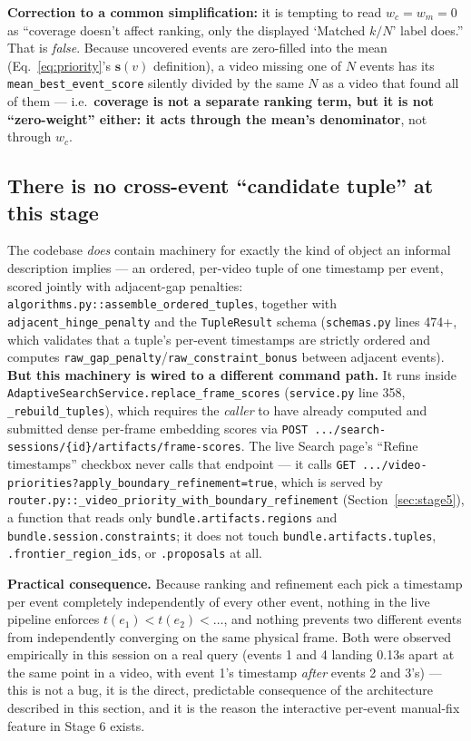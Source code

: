 \documentclass[11pt]{article}
\newcommand{\code}[1]{\texttt{\small #1}}
\newcommand{\file}[1]{\texttt{\footnotesize #1}}
\newcommand{\corr}[1]{\textbf{\textcolor{red!60!black}{#1}}}
\begin{document}
\corr{Correction to a common simplification:} it is tempting to read
$w_c = w_m = 0$ as ``coverage doesn't affect ranking, only the displayed
`Matched $k/N$' label does.'' That is \emph{false}. Because uncovered events
are zero-filled into the mean (Eq.~\ref{eq:priority}'s $\mathbf{s}(v)$
definition), a video missing one of $N$ events has its
\code{mean\_best\_event\_score} silently divided by the same $N$ as a video
that found all of them --- i.e.\ \textbf{coverage is not a separate ranking
term, but it is not ``zero-weight'' either: it acts through the mean's
denominator}, not through $w_c$.

\subsection{\corr{There is no cross-event ``candidate tuple'' at this stage}}
\label{sec:no-tuple}
The codebase \emph{does} contain machinery for exactly the kind of object an
informal description implies --- an ordered, per-video tuple of one timestamp
per event, scored jointly with adjacent-gap penalties:
\code{algorithms.py::assemble\_ordered\_tuples}, together with
\code{adjacent\_hinge\_penalty} and the \code{TupleResult} schema
(\file{schemas.py} lines 474+, which validates that a tuple's per-event
timestamps are strictly ordered and computes
\code{raw\_gap\_penalty}/\code{raw\_constraint\_bonus} between adjacent
events). \textbf{But this machinery is wired to a different command
path.} It runs inside \code{AdaptiveSearchService.replace\_frame\_scores}
(\file{service.py} line 358, \code{\_rebuild\_tuples}), which requires the
\emph{caller} to have already computed and submitted dense per-frame
embedding scores via \code{POST
.../search-sessions/\{id\}/artifacts/frame-scores}. The live Search page's
``Refine timestamps'' checkbox never calls that endpoint --- it calls
\code{GET .../video-priorities?apply\_boundary\_refinement=true}, which is
served by \code{router.py::\_video\_priority\_with\_boundary\_refinement}
(Section~\ref{sec:stage5}), a function that reads only
\code{bundle.artifacts.regions} and \code{bundle.session.constraints};
it does not touch \code{bundle.artifacts.tuples},
\code{.frontier\_region\_ids}, or \code{.proposals} at all.

\textbf{Practical consequence.} Because ranking and refinement each pick a
timestamp per event completely independently of every other event, nothing
in the live pipeline enforces $t(e_1) < t(e_2) < \dots$, and nothing prevents
two different events from independently converging on the same physical
frame. Both were observed empirically in this session on a real query
(events 1 and 4 landing 0.13s apart at the same point in a video, with event
1's timestamp \emph{after} events 2 and 3's) --- this is not a bug, it is the
direct, predictable consequence of the architecture described in this
section, and it is the reason the interactive per-event manual-fix feature in
Stage 6 exists.
\end{document}

